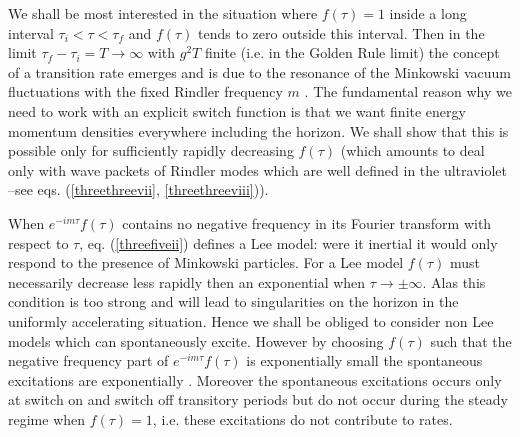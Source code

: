 We shall be most interested in the situation where $f(\tau)=1$ inside a long
interval $\tau_i < \tau < \tau_f$ and $f(\tau)$ tends to
zero outside this interval.
Then in the limit $\tau_f-\tau_i =T \to \infty$
with $g^2 T$ finite (i.e. in the Golden Rule limit)
the concept of a transition rate
emerges
and is due to the resonance of the Minkowski vacuum fluctuations with the
fixed Rindler frequency $m$ \cite{pbt}. The
fundamental reason
why we need to work with an explicit switch function is that we want  finite
energy
momentum densities everywhere including the horizon.
We shall show that this is possible only for
sufficiently rapidly decreasing $f(\tau)$ (which
amounts to deal only with wave packets
of Rindler modes which are well defined in the ultraviolet --see eqs.
(\ref{threethreevii},
 \ref{threethreeviii})).

When
$e^{-im\tau} f(\tau)$ contains
no negative frequency in its Fourier transform with respect to $\tau$,
eq. (\ref{threefiveii}) defines
 a Lee model:
were it inertial it would only respond to the presence
of Minkowski
particles.
For a Lee model $f(\tau)$ must necessarily decrease
less
rapidly then an exponential when $\tau \rightarrow \pm \infty$. Alas
this condition is too
strong and will lead to singularities on the horizon in the
uniformly accelerating situation. Hence
we shall be obliged to consider
non Lee models which can spontaneously excite. However by
choosing $f(\tau)$ such that the negative frequency part of $e^{-im\tau}
f(\tau)$ is exponentially small the spontaneous  excitations are
exponentially . Moreover the spontaneous excitations occurs
only at
switch
on and switch off transitory periods
but do not occur during the steady regime when $f(\tau)=1$, i.e. these
excitations
do not contribute to rates.

